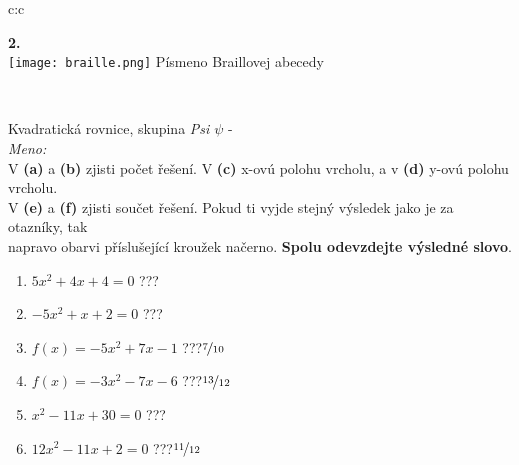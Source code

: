 \documentclass[10pt]{report}
\begin{document}
\begin{tabular}{c:c}
\begin{minipage}[c][99mm][t]{0.49\linewidth}
\begin{center}
\begin{minipage}{0.20\linewidth}
\begin{center}
{\Huge\bfseries 2.} \\[2mm]
\texttt{[image: braille.png]}
{\small Písmeno Braillovej abecedy}
\end{center}
\end{minipage}
\end{center}
\end{minipage}
\\ \hdashline
\begin{minipage}[c][99mm][t]{0.49\linewidth}
\begin{center}
\vspace{7mm}
{\huge Kvadratická rovnice, skupina \textit{Psi $\psi$} -}\\[4.5mm]
\textit{Meno:}\phantom{xxxxxxxxxxxxxxxxxxxxxxxxxxxxxxxxxxxxxxxxxxxxxxxxxxxxxxxxxxxxxxxxx}\\[3.5mm]
V \textbf{(a)} a \textbf{(b)} zjisti počet řešení. V \textbf{(c)} x-ovú polohu vrcholu, a v \textbf{(d)} y-ovú polohu vrcholu.\\V \textbf{(e)} a \textbf{(f)} zjisti součet řešení. Pokud ti vyjde stejný výsledek jako je za otazníky, tak\\napravo obarvi příslušející kroužek načerno. \textbf{Spolu odevzdejte výsledné slovo}.\\[3mm]
\begin{minipage}{0.77\linewidth}
\begin{center}
\begin{varwidth}{\textwidth}
\begin{enumerate}
\large
\item $5x^2+4x+4=0$\quad \dotfill\; ???\;\dotfill {}
\item $-5x^2+x+2=0$\quad \dotfill\; ???\;\dotfill {}
\item $f(x)=-5x^2+7x-1$\quad \dotfill\; ???\;\dotfill \quad $\nicefrac{7}{10}$
\item $f(x)=-3x^2-7x-6$\quad \dotfill\; ???\;\dotfill \quad $\nicefrac{13}{12}$
\item $x^2-11x+30=0$\quad \dotfill\; ???\;\dotfill {}
\item $12x^2-11x+2=0$\quad \dotfill\; ???\;\dotfill \quad $\nicefrac{11}{12}$
\end{enumerate}
\end{varwidth}
\end{center}
\end{minipage}
\begin{minipage}{0.20\linewidth}
\begin{center}

\end{center}
\end{minipage}
\end{center}
\end{minipage}
\end{tabular}
\end{document}
